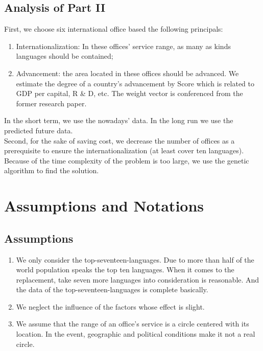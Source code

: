 \documentclass{mcmthesis}
\begin{document}
\subsection{Analysis of Part II}
First, we choose six international office based the following principals: 
\begin{enumerate}[1]
\item Internationalization: In these offices' service range, as many as kinds languages should be contained;
\item Advancement: the area located in these offices should be advanced. We estimate the degree of a country's advancement by Score which is related to GDP per capital, R \& D, etc. The weight vector is conferenced from the former research paper. 
\end{enumerate}
In the short term, we use the nowadays' data. In the long run we use the predicted future data.\\
\indent Second, for the sake of saving cost, we decrease the number of offices as a prerequisite to ensure the internationalization (at least cover ten languages). Because of the time complexity of the problem is too large, we use the genetic algorithm to find the solution. 

\section{Assumptions and Notations}
\subsection{Assumptions}
\begin{enumerate}[1]
\item We only consider the top-seventeen-languages. Due to more than half of the world population speaks the top ten languages. When it comes to the replacement, take seven more languages into consideration is reasonable. And the data of the top-seventeen-languages is complete basically. 
\item We neglect the influence of the factors whose effect is slight. 
\item We assume that the range of an office's service is a circle centered with its location. In the event, geographic and political conditions make it not a real circle. 
\end{enumerate}
\end{document}
